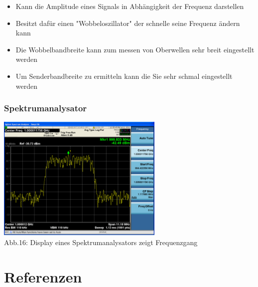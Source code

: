 \begin{frame}
	\begin{itemize}
		\item	Kann die Amplitude eines Signals in Abhängigkeit der Frequenz darstellen
		\item	Besitzt dafür einen "Wobbeloszillator" der schnelle seine Frequenz ändern kann
		\item	Die Wobbelbandbreite kann zum messen von Oberwellen sehr breit eingestellt werden
		\item	Um Senderbandbreite zu ermitteln kann die Sie sehr schmal eingestellt werden
	\end{itemize}
\end{frame}

\begin{frame}
    \frametitle{Spektrumanalysator}
    \begin{center}
        \includegraphics[width=0.6\textwidth]{a16/Spektrumanalysator-Display.png}\\
        Abb.16: Display eines Spektrumanalysators zeigt Frequenzgang \cite{wp}
	\end{center}
\end{frame}

\section*{Referenzen}

